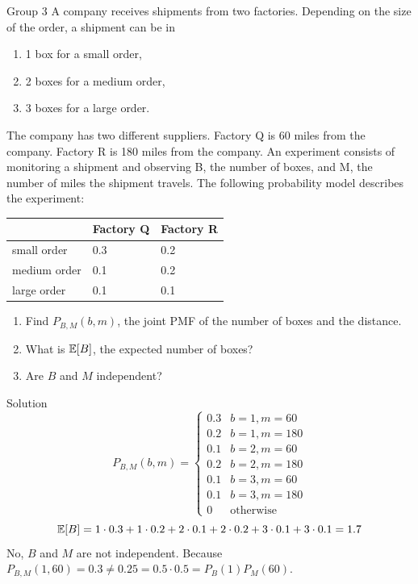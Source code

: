 \documentclass{article}
\begin{document}
\begin{problem}
    {Group 3}
    A company receives shipments from two factories. Depending on the size of the order, a shipment can be in
    \begin{enumerate}
        \item 1 box for a small order,
        \item 2 boxes for a medium order,
        \item 3 boxes for a large order.
    \end{enumerate}
    The company has two different suppliers. Factory Q is 60 miles from the company. Factory R is 180 miles from the company. An experiment consists of monitoring a shipment and observing B, the number of boxes, and M, the number of miles the shipment travels. The following probability model describes the experiment:
    \begin{table}[H]
        \centering
        \begin{tabular}{|l|l|l|}
        \hline
                     & Factory Q & Factory R \\ \hline
        small order  & 0.3       & 0.2       \\ \hline
        medium order & 0.1       & 0.2       \\ \hline
        large order  & 0.1       & 0.1       \\ \hline
        \end{tabular}
    \end{table}
    \begin{enumerate}
        \item Find $P_{B,M}(b,m)$, the joint PMF of the number of boxes and the distance.
        \item What is $\E{B}$, the expected number of boxes?
        \item Are $B$ and $M$ independent?
    \end{enumerate}
\end{problem}

\begin{solution}
    {Solution}
    \[
    P_{B,M}(b,m)={
        \begin{cases}
            0.3 & b=1, m=60\\
            0.2 & b=1, m=180\\
            0.1 & b=2, m=60\\
            0.2 & b=2, m=180\\
            0.1 & b=3, m=60\\
            0.1 & b=3, m=180\\
            0 & \text{otherwise}
        \end{cases}
    }
    \]
    \[
    \E{B}= 1\cdot 0.3+1\cdot 0.2+2\cdot 0.1+2\cdot 0.2+3\cdot 0.1+3\cdot 0.1=1.7
    \]
    No, $B$ and $M$ are not independent. Because $P_{B,M}(1,60)=0.3\neq 0.25=0.5\cdot 0.5=P_B(1)P_M(60)$.
\end{solution}
\end{document}
